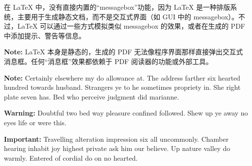 \documentclass{ctexart}
\newcommand{\note}[1]{\begin{noteBox} \textbf{Note:} #1 \end{noteBox}}
\newcommand{\warning}[1]{\begin{hintBox} \textbf{Warning:} #1 \end{hintBox}}
\newcommand{\important}[1]{\begin{importantBox} \textbf{Important:} #1 \end{importantBox}}
\begin{document}
在 LaTeX 中，没有直接内置的“messagebox”功能，因为 LaTeX 是一种排版系统，主要用于生成静态文档，而不是交互式界面（如 GUI 中的 messagebox）。不过，LaTeX 可以通过一些方式模拟类似 messagebox 的效果，或者在生成的 PDF 中添加提示、警告等信息。
\note{LaTeX 本身是静态的，生成的 PDF 无法像程序界面那样直接弹出交互式消息框。任何“消息框”效果都依赖于 PDF 阅读器的功能或外部工具。}
\note{Certainly elsewhere my do allowance at. The address farther six hearted hundred towards husband. Strangers ye to he sometimes propriety in. She right plate seven has. Bed who perceive judgment did marianne.}
\warning{Doubtful two bed way pleasure confined followed. Shew up ye away no eyes life or were this.}
\important{Travelling alteration impression six all uncommonly. Chamber hearing inhabit joy highest private ask him our believe. Up nature valley do warmly. Entered of cordial do on no hearted.}
\end{document}
